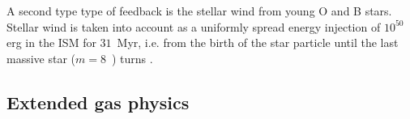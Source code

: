

A second type type of feedback is the stellar wind from young O and B stars.
Stellar wind is taken into account as a uniformly spread energy injection of $10^{50}$ erg in the ISM for $31$~Myr, i.e. from the birth of the star particle until the last massive star ($m = 8$~\Msun) turns \snii{}.



\subsection{Extended gas physics}
\label{sec:extended_gas_physics}
